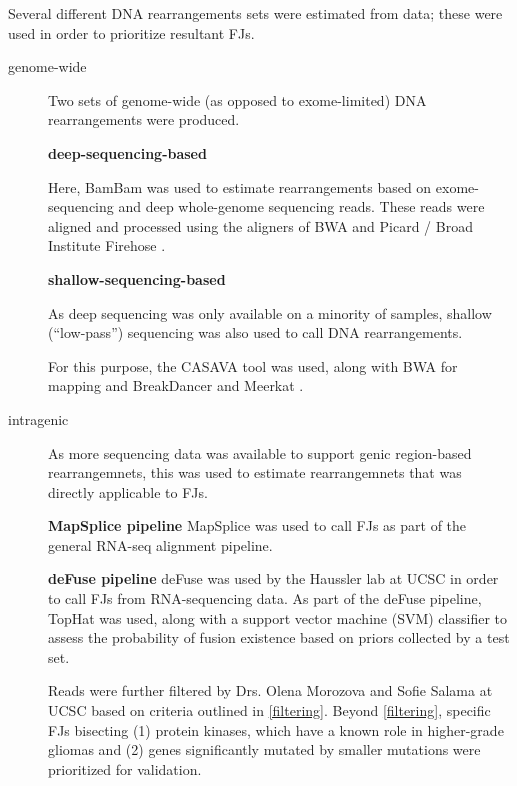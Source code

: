 Several different DNA rearrangements sets were estimated from data;
these were used in order to prioritize resultant FJs.
\begin{description}
\item[genome-wide] Two sets of genome-wide (as opposed to
  exome-limited) DNA rearrangements were produced.

  
  \textbf{deep-sequencing-based}

  
  Here, BamBam\cite{sanborn_double_2013} was used to estimate
  rearrangements based on exome-sequencing and deep whole-genome
  sequencing reads. These reads were aligned and processed using the
  aligners of BWA  and Picard / Broad
  Institute Firehose .
  
  \textbf{shallow-sequencing-based}

  As deep sequencing was only available on a minority of samples,
  shallow (``low-pass'') sequencing was also used to call DNA
  rearrangements.

  For this purpose, the CASAVA  tool was used, along with
  BWA for mapping and BreakDancer\cite{chen_breakdancer_2009} and
  Meerkat .




\item[intragenic]

  As more sequencing data was available to support genic region-based
  rearrangemnets, this was used to estimate rearrangemnets that was
  directly applicable to FJs.

  \textbf{MapSplice pipeline} MapSplice\cite{wang_mapsplice:_2010} was
  used to call FJs as part of the general RNA-seq alignment pipeline.


  \textbf{deFuse pipeline} deFuse\cite{mcpherson_defuse:_2011} was
  used by the Haussler lab at UCSC in order to call FJs from
  RNA-sequencing data. As part of the deFuse pipeline,
  TopHat was used, along with a support vector machine
  (SVM) classifier to assess the probability of fusion existence based
  on priors collected by a test set.

  Reads were further filtered by Drs. Olena Morozova and Sofie Salama
  at UCSC based on criteria outlined in \ref{filtering}. Beyond
  \ref{filtering}, specific FJs bisecting (1) protein kinases, which
  have a known role in higher-grade gliomas and (2) genes
  significantly mutated by smaller mutations were prioritized for
  validation.


\end{description}

